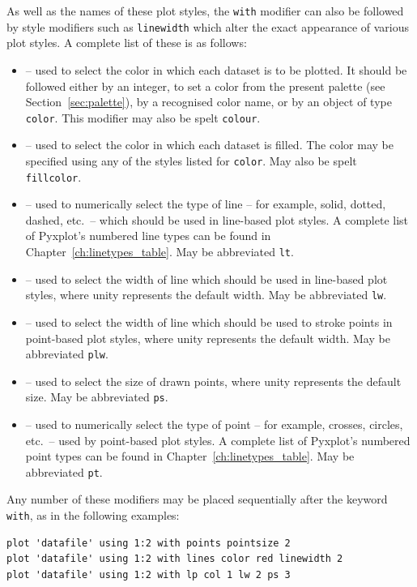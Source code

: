 As well as the names of these plot styles, the {\tt with} modifier can also be
followed by style modifiers such as {\tt line\-width} which alter the exact
appearance of various plot styles. A complete list of these is as follows:
\begin{itemize}
\item {} -- used to select the color in which each dataset is to be plotted. It should be followed either by an integer, to set a color from the present palette (see Section~\ref{sec:palette}), by a recognised color name, or by an object of type {\tt color}. This modifier may also be spelt {\tt colour}.
\item {} -- used to select the color in which each dataset is filled. The color may be specified using any of the styles listed for {\tt color}. May also be spelt {\tt fillcolor}.
\item {} -- used to numerically select the type of line -- for example, solid, dotted, dashed, etc.\ -- which should be used in line-based plot styles. A complete list of Pyxplot's numbered line types can be found in Chapter~\ref{ch:linetypes_table}. May be abbreviated {\tt lt}.
\item {} -- used to select the width of line which should be used in line-based plot styles, where unity represents the default width. May be abbreviated {\tt lw}.
\item {} -- used to select the width of line which should be used to stroke points in point-based plot styles, where unity represents the default width. May be abbreviated {\tt plw}.
\item {} -- used to select the size of drawn points, where unity represents the default size. May be abbreviated {\tt ps}.
\item {} -- used to numerically select the type of point -- for example, crosses, circles, etc.\ -- used by point-based plot styles. A complete list of Pyxplot's numbered point types can be found in Chapter~\ref{ch:linetypes_table}. May be abbreviated {\tt pt}.
\end{itemize}

Any number of these modifiers may be placed sequentially after the keyword {\tt
with}, as in the following examples:

\begin{verbatim}
plot 'datafile' using 1:2 with points pointsize 2
plot 'datafile' using 1:2 with lines color red linewidth 2
plot 'datafile' using 1:2 with lp col 1 lw 2 ps 3
\end{verbatim}

